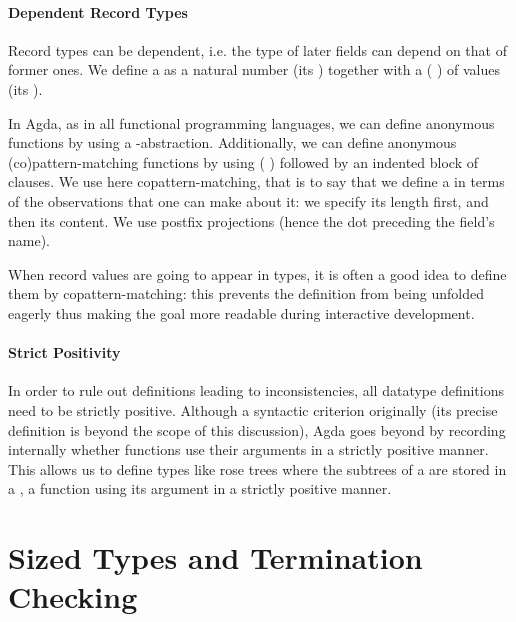 \paragraph{Dependent Record Types}

Record types can be dependent, i.e. the type of later fields can depend on that of
former ones. We define a  as a natural number (its ) together
with a ( ) of values (its ).


In Agda, as in all functional programming languages, we can define anonymous functions
by using a -abstraction. Additionally, we can define anonymous (co)pattern-matching
functions by using ( ) followed by an indented block of clauses.
We use here copattern-matching, that is to say that we define a  in terms
of the observations that one can make about it: we specify its length first, and
then its content. We use postfix projections (hence the dot preceding the field's name).


When record values are going to appear in types, it is often a good idea to define
them by copattern-matching: this prevents the definition from being unfolded eagerly
thus making the goal more readable during interactive development.

\paragraph{Strict Positivity} In order to rule out definitions leading to
inconsistencies, all datatype definitions need to be strictly positive.
Although a syntactic criterion originally (its precise definition is beyond
the scope of this discussion), Agda goes beyond by recording internally
whether functions use their arguments in a strictly positive manner.
This allows us to define types like rose trees where the subtrees of a
 are stored in a , a function using its 
argument in a strictly positive manner.


\section{Sized Types and Termination Checking}
\label{sec:sizetermination}


